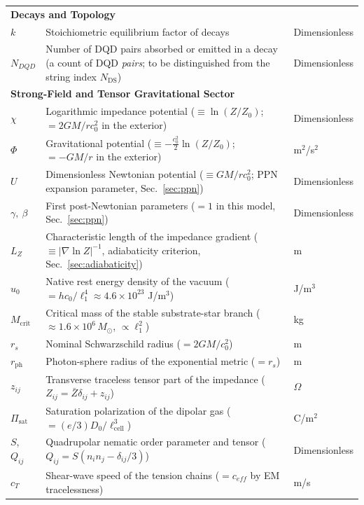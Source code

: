 \documentclass[11pt,a4paper]{article}
\theoremstyle{plain}
\theoremstyle{remark}
\newcommand{\Ncd}{\ensuremath{N_{\mathrm{DS}}}}
\begin{document}
\begin{longtable}{l >{\raggedright\arraybackslash}p{8.8cm} l}
\multicolumn{3}{l}{\textbf{Decays and Topology}} \\
$k$ & Stoichiometric equilibrium factor of decays & Dimensionless \\
$N_{DQD}$ & Number of DQD pairs absorbed or emitted in a decay (a count of DQD \emph{pairs}; to be distinguished from the string index $\Ncd$) & Dimensionless \\
\midrule

\multicolumn{3}{l}{\textbf{Strong-Field and Tensor Gravitational Sector}} \\
$\chi$ & Logarithmic impedance potential ($\equiv \ln(Z/Z_0)$; $= 2GM/rc_0^2$ in the exterior) & Dimensionless \\
$\Phi$ & Gravitational potential ($\equiv -\tfrac{c_0^2}{2}\ln(Z/Z_0)$; $= -GM/r$ in the exterior) & m$^2$/s$^2$ \\
$U$ & Dimensionless Newtonian potential ($\equiv GM/rc_0^2$; PPN expansion parameter, Sec.~\ref{sec:ppn}) & Dimensionless \\
$\gamma,\ \beta$ & First post-Newtonian parameters ($= 1$ in this model, Sec.~\ref{sec:ppn}) & Dimensionless \\
$L_Z$ & Characteristic length of the impedance gradient ($\equiv |\nabla\ln Z|^{-1}$, adiabaticity criterion, Sec.~\ref{sec:adiabaticity}) & m \\
$u_0$ & Native rest energy density of the vacuum ($= hc_0/\ell_1^4 \approx 4.6\times10^{23}$ J/m$^3$) & J/m$^3$ \\
$M_{\text{crit}}$ & Critical mass of the stable substrate-star branch ($\approx 1.6\times10^{6}\,M_\odot$, $\propto \ell_1^2$) & kg \\
$r_s$ & Nominal Schwarzschild radius ($= 2GM/c_0^2$) & m \\
$r_{\text{ph}}$ & Photon-sphere radius of the exponential metric ($= r_s$) & m \\
$z_{ij}$ & Transverse traceless tensor part of the impedance ($Z_{ij} = \bar{Z}\delta_{ij} + z_{ij}$) & $\Omega$ \\
$\Pi_{\text{sat}}$ & Saturation polarization of the dipolar gas ($= (e/3)D_0/\ell_{\text{cell}}^3$) & C/m$^2$ \\
$S$, $Q_{ij}$ & Quadrupolar nematic order parameter and tensor ($Q_{ij} = S(n_i n_j - \delta_{ij}/3)$) & Dimensionless \\
$c_T$ & Shear-wave speed of the tension chains ($= c_{eff}$ by EM tracelessness) & m/s \\
\bottomrule
\end{longtable}
\end{document}

